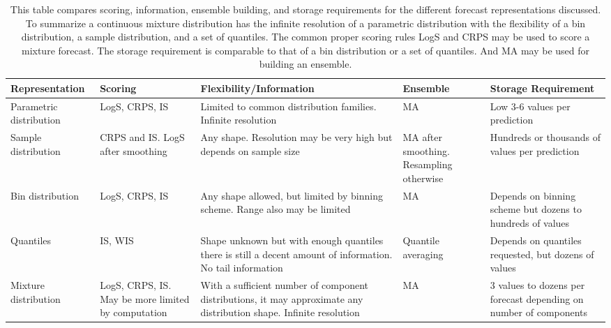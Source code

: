 \documentclass[11pt,notitlepage]{isuthesis}
\begin{document}
\begin{flushleft}

  \begin{table}
   \begin{adjustwidth}{-1cm}{-1cm}
    \begin{tabular}{ | p{2.9cm} || p{3cm} | p{4cm} | p{3cm} | p{3.5cm} |}
    \hline
    \textbf{Representation} & \textbf{Scoring} & 
    \textbf{Flexibility/Information} & \textbf{Ensemble} &
    \textbf{Storage Requirement}
    \\ \hline \hline

    Parametric distribution & LogS, CRPS, IS & Limited to common 
    distribution families. 
    Infinite resolution
    & MA & Low 3-6 values per prediction \\ \hline
    
    Sample distribution & CRPS and IS. LogS after smoothing & Any shape. 
    Resolution may be
    very high but depends on sample size & MA after smoothing. Resampling 
    otherwise & 
    Hundreds or thousands of values per prediction
    \\ \hline
    
    Bin distribution & LogS, CRPS, IS &
    Any shape allowed, but limited by binning scheme. Range also may be limited
    & MA &
    Depends on binning scheme but dozens to hundreds of values
    \\ \hline


    Quantiles & IS, WIS & Shape unknown but with enough quantiles there is still
    a decent amount of information. No tail information & 
    Quantile averaging & Depends on 
    quantiles requested, but dozens of values
    \\ \hline
    
    Mixture distribution & LogS, CRPS, IS. May be more limited by computation & 
    With a sufficient number of
    component distributions, it may
    approximate any distribution shape. Infinite resolution& MA 
    & 3 values to dozens per forecast depending on number of components
    \\ \hline
    
  
   
	 \end{tabular}
	 \end{adjustwidth}
	  \begin{center}
    \begin{minipage}{14cm}
    \captionsetup{font=scriptsize}
   \caption[Forecast representation comparison]{This table compares scoring,
   information, ensemble building, and storage requirements for the different
   forecast representations discussed. To summarize 
   a continuous mixture distribution has the 
infinite resolution of a parametric distribution with the flexibility of a bin
distribution, a sample distribution, and a set of quantiles. The common proper
scoring rules LogS and CRPS may be used to score a mixture forecast. 
The storage requirement is
comparable to that of a bin distribution or a set of quantiles. And MA may be 
used for building an ensemble.}
   \label{table:repscomp}
   \end{minipage}
   \end{center}
   \end{table}
	 

\end{flushleft}
\end{document}
